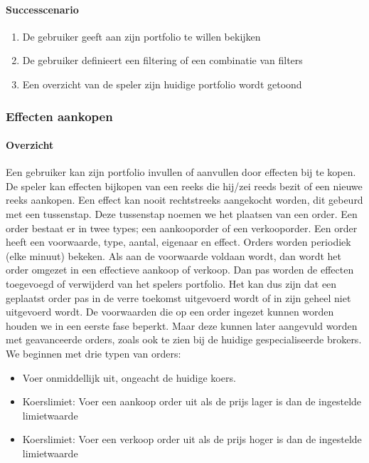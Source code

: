 \paragraph{Successcenario}
\begin{enumerate}
 \item De gebruiker geeft aan zijn portfolio te willen bekijken
 \item De gebruiker definieert een filtering of een combinatie van filters
 \item Een overzicht van de speler zijn huidige portfolio wordt getoond
\end{enumerate}

\subsubsection{Effecten aankopen}

\paragraph{Overzicht}Een gebruiker kan zijn portfolio invullen of aanvullen door effecten bij te kopen. De speler kan effecten bijkopen van een reeks die hij/zei reeds bezit of een nieuwe reeks aankopen. Een effect kan nooit rechtstreeks aangekocht worden, dit gebeurd met een tussenstap. Deze tussenstap noemen we het plaatsen van een order. Een order bestaat er in twee types; een aankooporder of een verkooporder. Een order heeft een voorwaarde, type, aantal, eigenaar en effect. Orders worden periodiek (elke minuut) bekeken. Als aan de voorwaarde voldaan wordt, dan wordt het order omgezet in een effectieve aankoop of verkoop. Dan pas worden de effecten toegevoegd of verwijderd van het spelers portfolio. Het kan dus zijn dat een geplaatst order pas in de verre toekomst uitgevoerd wordt of in zijn geheel niet uitgevoerd wordt. De voorwaarden die op een order ingezet kunnen worden houden we in een eerste fase beperkt. Maar deze kunnen later aangevuld worden met geavanceerde orders, zoals ook te zien bij de huidige gespecialiseerde brokers. We beginnen met drie typen van orders:

\begin{itemize}
 \item Voer onmiddellijk uit, ongeacht de huidige koers.
 \item Koerslimiet: Voer een aankoop order uit als de prijs lager is dan de ingestelde limietwaarde
 \item Koerslimiet: Voer een verkoop order uit als de prijs hoger is dan de ingestelde limietwaarde
\end{itemize}

